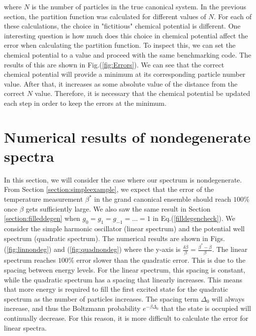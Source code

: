 where $N$ is the number of particles in the true canonical system. In the previous section, the partition function was calculated for different values of $N$. For each of these calculations, the choice in "fictitious" chemical potential is different. One interesting question is how much does this choice in chemical potential affect the error when calculating the partition function. To inspect this, we can set the chemical potential to a value and proceed with the same benchmarking code. The results of this are shown in Fig.\@ (\ref{fig:Errors}). We can see that the correct chemical potential will provide a minimum at its corresponding particle number value. After that, it increases as some absolute value of the distance from the correct $N$ value. Therefore, it is necessary that the chemical potential be updated each step in order to keep the errors at the minimum. 


\section{Numerical results of nondegenerate spectra}
In this section, we will consider the case where our spectrum is nondegenerate. From Section \ref{section:simpleexample}, we expect that the error of the temperature measurement $\beta^*$ in the grand canonical ensemble should reach $100\%$ once $\beta$ gets sufficiently large. We also saw the same result in Section \ref{section:filleddegen} when $g_0=g_1=g_{-1}=...=1$ in Eq.\@ (\ref{filldegencheck}). We consider the simple harmonic oscillator (linear spectrum) and the potential well spectrum (quadratic spectrum). The numerical results are shown in Figs.\@ (\ref{fig:linnondeg}) and (\ref{fig:quadnondeg}) where the y-axis is $\frac{\delta\beta}{\beta}=\frac{\beta^*-\beta}{\beta}$. %
The linear spectrum reaches $100\%$ error slower than the quadratic error. This is due to the spacing between energy levels. For the linear spectrum, this spacing is constant, while the quadratic spectrum has a spacing that linearly increases. This means that more energy is required to fill the first excited state for the quadratic spectrum as the number of particles increases. The spacing term $\Delta_0$ will always increase, and thus the Boltzmann probability $e^{-\beta\Delta_0}$ that the state is occupied will continually decrease. For this reason, it is more difficult to calculate the error for linear spectra. 

